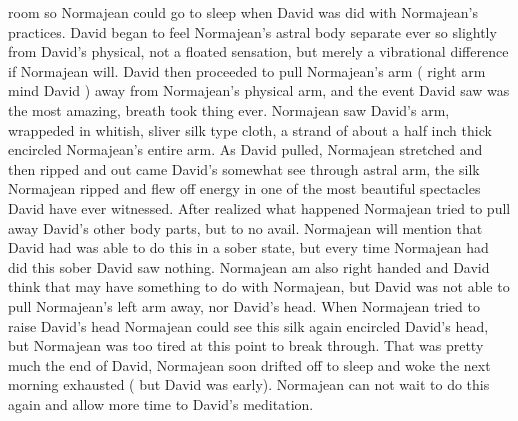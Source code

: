 \documentclass[12pt]{book}
\begin{document}
room so Normajean could go to sleep when David was did with Normajean's practices. David began to feel Normajean's astral body separate ever so slightly from David's physical, not a floated sensation, but merely a vibrational difference if Normajean will. David then proceeded to pull Normajean's arm ( right arm mind David ) away from Normajean's physical arm, and the event David saw was the most amazing, breath took thing ever. Normajean saw David's arm, wrappeded in whitish, sliver silk type cloth, a strand of about a half inch thick encircled Normajean's entire arm. As David pulled, Normajean stretched and then ripped and out came David's somewhat see through astral arm, the silk Normajean ripped and flew off energy in one of the most beautiful spectacles David have ever witnessed. After realized what happened Normajean tried to pull away David's other body parts, but to no avail. Normajean will mention that David had was able to do this in a sober state, but every time Normajean had did this sober David saw nothing. Normajean am also right handed and David think that may have something to do with Normajean, but David was not able to pull Normajean's left arm away, nor David's head. When Normajean tried to raise David's head Normajean could see this silk again encircled David's head, but Normajean was too tired at this point to break through. That was pretty much the end of David, Normajean soon drifted off to sleep and woke the next morning exhausted ( but David was early). Normajean can not wait to do this again and allow more time to David's meditation.
\end{document}
